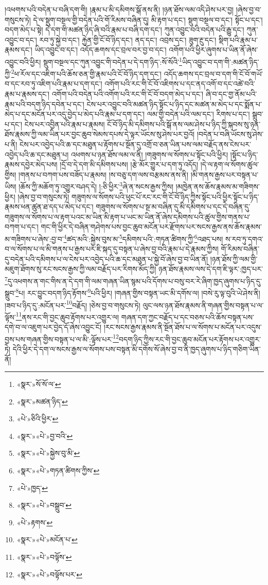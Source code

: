 །འཕགས་པའི་བདེན་པ་བཞི་དག་གི། །རྣམ་པ་མི་དམིགས་སྒོ་ནས་ནི། །ཉན་ཐོས་ལམ་འདི་ཤེས་པར་བྱ། །ཞེས་བྱ་བ་གསུངས་ཏེ། དེ་ལ་སྡུག་བསྔལ་གྱི་བདེན་པའི་གོ་རིམས་བཞིན་དུ། མི་རྟག་པ་དང་། སྡུག་བསྔལ་བ་དང་། སྟོང་པ་དང་། བདག་མེད་པ་སྟེ། དེ་དག་གི་མཚན་ཉིད་ཞི་བའི་རྣམ་པ་བཞི་དག་དང་། ཀུན་འབྱུང་བའི་བདེན་པའི་རྒྱུ་དང་། ཀུན་འབྱུང་བ་དང་། རབ་ཏུ་སྐྱེ་བ་དང་། རྐྱེན་གྱི་ངོ་བོ་ཉིད་དང་། ནད་དང་། འབྲས་དང་། ཟུག་རྔུ་དང་། སྡིག་པའི་རྣམ་པ་རྣམས་དང་། ཡིད་འབྱུང་བ་དང་། འདོད་ཆགས་དང་བྲལ་བར་བྱ་བ་དང་། འགོག་པའི་ཕྱིར་ཞུགས་པ་ཡིན་ནོ་ཞེས་འབྱུང་བའི་ཕྱིར། སྡུག་བསྔལ་དང་ཀུན་འབྱུང་གི་བདེན་པ་དེ་དག་ཉིད་:སོ་སོའི་\footnote{«སྣར་»སོ་སོ་ལ་}ཡིད་འབྱུང་བ་དག་གི་:མཚན་ཉིད་ཀྱི་\footnote{«སྣར་»མཚན་ཉིད་}ཕ་རོལ་དང་འཇིག་པའི་ཆོས་ཅན་གྱི་རྣམ་པའི་ངོ་བོ་ཉིད་དག་དང་། འདོད་ཆགས་དང་བྲལ་བ་དག་གི་ངོ་བོ་གཡོ་བ་དང་རབ་ཏུ་འཇིག་པའི་རྣམ་པ་དག་དང་། འགོག་པའི་རང་གི་ངོ་བོ་འཇིགས་པ་དང་ནད་འགོ་བ་དང་འཚེ་བའི་རྣམ་པ་རྣམས་དང་། འགོག་པའི་བདེན་པའི་འགོག་པའི་རང་གི་ངོ་བོ་བདག་མེད་པ་དང་། ཞི་བ་དང་གྱ་ནོམ་པའི་རྣམ་པའི་བདག་ཉིད་དབེན་པ་དང་། ངེས་པར་འབྱུང་བའི་མཚན་ཉིད་སྟོང་པ་ཉིད་དང་མཚན་མ་མེད་པ་དང་སྨོན་པ་མེད་པ་དང་མངོན་པར་འདུ་བྱེད་པ་མེད་པའི་རྣམ་པ་དག་དང་། ལམ་གྱི་བདེན་པའི་ལམ་དང་། རིགས་པ་དང་། སྒྲུབ་པ་དང་། ངེས་པར་འབྱིན་པའི་རྣམ་པ་རྣམས། ངོ་བོ་ཉིད་མི་དམིགས་པའི་སྒོ་ནས་ལམ་ཤེས་པ་ཉིད་ཀྱི་སྐབས་སུ་ཉན་ཐོས་རྣམས་ཀྱི་ལམ་ཡིན་པར་བྱང་ཆུབ་སེམས་དཔས་དེ་ལྟར་ཡོངས་སུ་ཤེས་པར་བྱའོ། །བདེན་པ་བཞི་ཡོངས་སུ་ཤེས་པ་ནི། ངེས་པར་འབྱེད་པའི་ཆ་དང་མཐུན་པ་རྟོགས་པ་སྔོན་དུ་འགྲོ་བ་ཅན་ཡིན་པས་ལམ་བརྗོད་ནས་ངེས་པར་འབྱེད་པའི་ཆ་དང་མཐུན་པ། འཕགས་པ་ཉན་ཐོས་ལམ་ལ་ནི། །གཟུགས་ལ་སོགས་པ་སྟོང་པའི་ཕྱིར། །སྟོང་པ་ཉིད་རྣམས་དབྱེར་མེད་པས། །དྲོ་བ་དེ་དག་མི་དམིགས་པས། །རྩེ་མོར་གྱུར་པ་དག་ཏུ་འདོད། །དེ་ལ་རྟག་ལ་སོགས་ཚུལ་གྱིས། །གནས་པ་བཀག་པས་བཟོད་པ་རྣམས། །ས་བཅུ་དག་ལས་བརྩམས་ནས་ནི། །མི་གནས་རྒྱས་པར་བསྟན་པ་ཡིས། །ཆོས་ཀྱི་མཆོག་ཏུ་འགྱུར་བཤད་དེ། །:ཅི་ཕྱིར་\footnote{«པེ་»ཅིའི་ཕྱིར་}ཞེ་ན་སངས་རྒྱས་ཀྱིས། །མཁྱེན་ནས་ཆོས་རྣམས་མ་གཟིགས་ཕྱིར། །ཞེས་བྱ་བ་གསུངས་ཏེ། གཟུགས་ལ་སོགས་པའི་ཕུང་པོ་རང་རང་གི་ངོ་བོ་ཉིད་ཀྱིས་སྟོང་པའི་ཕྱིར་སྟོང་པ་ཉིད་རྣམས་ཕན་ཚུན་ཐ་དད་པ་མེད་པ་དང་། གཟུགས་ལ་སོགས་པ་སྔ་མ་བཞིན་དུ་མི་དམིགས་པ་དང་དེ་བཞིན་དུ་གཟུགས་ལ་སོགས་པ་ལ་རྟག་པའང་མ་ཡིན་མི་རྟག་པ་ཡང་མ་ཡིན་ནོ་ཞེས་དམིགས་པའི་ཚུལ་གྱིས་གནས་པ་བཀག་པ་དང་། གང་གི་ཕྱིར་དེ་བཞིན་གཤེགས་པས་བྱང་ཆུབ་མངོན་པར་རྫོགས་པར་སངས་རྒྱས་ནས་ཆོས་རྣམས་མ་གཟིགས་པ་ཞེས་:བྱ་བ་\footnote{«སྣར་»«པེ་»བྱ་བའི་}ཚད་མའི་:སྐྱེས་བུས་མ་\footnote{«སྣར་»«པེ་»སྐྱེས་བུ་མི་}དམིགས་པའི་:གཏན་ཚིགས་ཀྱི་\footnote{«སྣར་»«པེ་»གཏན་ཚིགས་ཀྱིས་}འཐད་པས། ས་རབ་ཏུ་དགའ་བ་ལ་སོགས་པ་ལ་མི་གནས་པ་རྒྱས་པར་ཇི་སྐད་དུ་བསྟན་པ་ཞེས་བྱ་བའི་རྣམ་པ་དེ་རྣམས་ཀྱིས། གོ་རིམས་བཞིན་དུ་བདེན་པའི་དམིགས་པ་ལ་ངེས་པར་འབྱེད་པའི་ཆ་དང་མཐུན་པ་སྐྱེ་བོ་ཞེས་བྱ་བ་ཡིན་ནོ། །ཉན་ཐོས་ཀྱི་ལམ་གྱི་མཇུག་ཐོགས་སུ་རང་སངས་རྒྱས་ཀྱི་ལམ་བརྗོད་པར་རིགས་མོད་ཀྱི། ཉན་ཐོས་རྣམས་ལས་དེ་དག་ཇི་ལྟར་:ཁྱད་པར་\footnote{«པེ་»ཁྱད་}དུ་འཕགས་ན་གང་གིས་ན་དེ་དག་གི་ལམ་གཞན་ཡིན་སྙམ་པའི་དོགས་པ་བསུ་བར་རེ་ཞིག་ཁྱད་ཞུགས་པ་ཉིད་དུ་སྒྲུབ་\footnote{«སྣར་»«པེ་»བསྒྲུབ་}པ། རང་བྱུང་བདག་ཉིད་རྟོགས་\footnote{«པེ་»རྟགས་}པའི་ཕྱིར། །གཞན་གྱིས་བསྟན་ཡང་མི་དགོས་ལ། །བསེ་རུ་ལྟ་བུའི་ཡེ་ཤེས་ནི། །ཟབ་པ་ཉིད་དུ་:མངོན་པར་\footnote{«སྣར་»«པེ་»མངོན་པ་}བརྗོད། །ཅེས་བྱ་བ་གསུངས་ཏེ། ལུང་ལས་ཉན་ཐོས་རྣམས་ནི་གཞན་གྱིས་བསྟན་པ་ལ་ལྟོས་\footnote{«སྣར་»«པེ་»བལྟོས་}ནས་རང་གི་བྱང་ཆུབ་རྟོགས་པར་འགྱུར་ལ། གཞན་དག་ཀྱང་བརྗོད་པ་དང་བཅས་པའི་ཆོས་བསྟན་པས་དགེ་བ་ལ་འཇུག་པར་བྱེད་དོ་ཞེས་འབྱུང་ངོ། །རང་སངས་རྒྱས་རྣམས་ནི་སྔོན་ཐོས་པ་ལ་སོགས་པ་མངོན་པར་འདུས་བྱས་པས་གཞན་གྱིས་བསྟན་པ་ལ་མི་:ལྟོས་པར་\footnote{«སྣར་»«པེ་»བལྟོས་པར་}བདག་ཉིད་ཀྱིས་རང་གི་བྱང་ཆུབ་མངོན་པར་རྟོགས་པར་འགྱུར་ཏེ། དེའི་ཕྱིར་དེ་དག་ལ་སངས་རྒྱས་ལ་སོགས་པས་བསྟན་མི་དགོས་སོ་ཞེས་བྱ་བ་ནི་ཁྱད་ཞུགས་པ་ཉིད་གཅིག་ཡིན་ནོ། 
